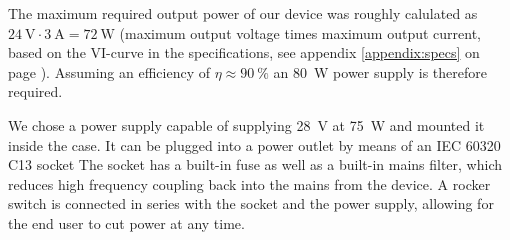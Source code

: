 The   maximum   required   output   power    of   our   device   was   roughly
calulated   as  $\SI{24}{\volt}   \cdot   \SI{3}{\ampere}  =   \SI{72}{\watt}$
(maximum  output   voltage  times  maximum   output  current,  based   on  the
VI-curve  in   the  specifications,   see  appendix   \ref{appendix:specs}  on
page  \pageref{appendix:specs}).   Assuming   an  efficiency  of  $\eta\approx
\SI{90}{\percent}$ an \SI{80}{W} power supply is therefore required.

We chose a power supply  capable of supplying \SI{28}{\volt} at \SI{75}{\watt}
and mounted  it inside the  case.  It  can be plugged  into a power  outlet by
means of an IEC  60320 C13 socket The socket has a built-in  fuse as well as a
built-in mains  filter, which  reduces high frequency  coupling back  into the
mains from the device.  A rocker switch is connected in series with the socket
and the power supply, allowing for the end user to cut power at any time.

%


